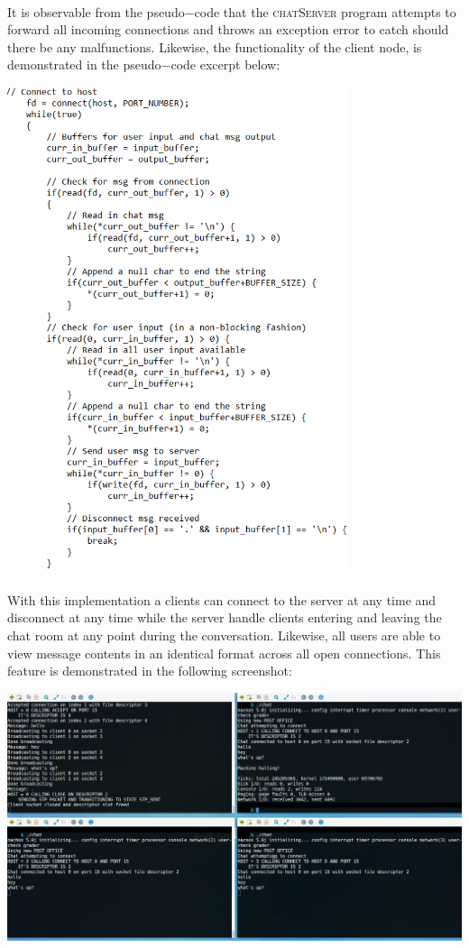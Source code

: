 \documentclass[12pt]{article}
\begin{document}
{\paragraph{} It is observable from the pseudo$-$code that the \textsc{chatServer} program attempts to forward all incoming connections and throws an exception error to catch should there be any malfunctions.
Likewise, the functionality of the client node, is demonstrated in the pseudo$-$code excerpt below:
\begin{center} \includegraphics[width=100mm]{Chat.png} \end{center}
\paragraph{} With this implementation a clients can connect to the server at any time and disconnect at any time while the server handle clients entering and leaving the chat room at any point during the conversation.
Likewise, all users are able to view message contents in an identical format across all open connections. This feature is demonstrated in the following screenshot:
\begin{center}
\includegraphics[width=160mm]{chatClientServer.png}
\end{center}
}
\end{document}
